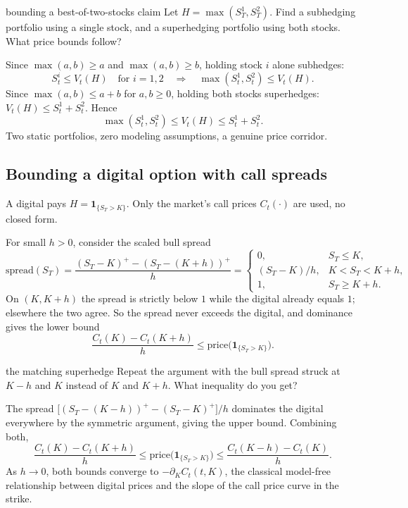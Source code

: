 \documentclass[10pt]{article}
\newcommand{\1}{\mathbf 1}
\theoremstyle{definition}
\begin{document}
\begin{studentexercise}{bounding a best-of-two-stocks claim}
Let \(H=\max(S_T^1,S_T^2)\). Find a subhedging portfolio using a single
stock, and a superhedging portfolio using both stocks. What price bounds
follow?
\end{studentexercise}
\begin{shortsolution}
Since \(\max(a,b)\geq a\) and \(\max(a,b)\geq b\), holding stock \(i\) alone
subhedges:
\[
S_t^i\leq V_t(H)\quad\text{for }i=1,2
\quad\Longrightarrow\quad
\max(S_t^1,S_t^2)\leq V_t(H).
\]
Since \(\max(a,b)\leq a+b\) for \(a,b\geq0\), holding both stocks
superhedges: \(V_t(H)\leq S_t^1+S_t^2\). Hence
\[
\boxed{
\max(S_t^1,S_t^2)\leq V_t(H)\leq S_t^1+S_t^2.}
\]
Two static portfolios, zero modeling assumptions, a genuine price corridor.
\end{shortsolution}

\subsection{Bounding a digital option with call spreads}

A digital pays \(H=\1_{\{S_T>K\}}\). Only the market's call prices
\(C_t(\cdot)\) are used, no closed form.

For small \(h>0\), consider the scaled bull spread
\[
\text{spread}(S_T)=\frac{(S_T-K)^+-(S_T-(K+h))^+}{h}
=\begin{cases}
0,&S_T\leq K,\\[2pt]
(S_T-K)/h,&K<S_T<K+h,\\[2pt]
1,&S_T\geq K+h.
\end{cases}
\]
On \((K,K+h)\) the spread is strictly below \(1\) while the digital already
equals \(1\); elsewhere the two agree. So the spread never exceeds the
digital, and dominance gives the lower bound
\[
\boxed{
\frac{C_t(K)-C_t(K+h)}{h}\leq\text{price}\bigl(\1_{\{S_T>K\}}\bigr).}
\]

\begin{studentexercise}{the matching superhedge}
Repeat the argument with the bull spread struck at \(K-h\) and \(K\)
instead of \(K\) and \(K+h\). What inequality do you get?
\end{studentexercise}
\begin{shortsolution}
The spread
\(\bigl[(S_T-(K-h))^+-(S_T-K)^+\bigr]/h\) dominates the digital everywhere
by the symmetric argument, giving the upper bound. Combining both,
\[
\boxed{
\frac{C_t(K)-C_t(K+h)}{h}
\leq
\text{price}\bigl(\1_{\{S_T>K\}}\bigr)
\leq
\frac{C_t(K-h)-C_t(K)}{h}.}
\]
As \(h\to0\), both bounds converge to \(-\partial_KC_t(t,K)\), the classical
model-free relationship between digital prices and the slope of the call
price curve in the strike.
\end{shortsolution}
\end{document}
